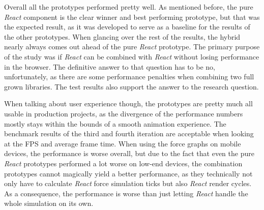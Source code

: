 Overall all the prototypes performed pretty well. As mentioned before, the pure \emph{React} component is the clear winner and best performing prototype, but that was the expected result, as it was developed to serve as a baseline for the results of the other prototypes. When glancing over the rest of the results, the hybrid nearly always comes out ahead of the pure \emph{React} prototype. The primary purpose of the study was if \emph{React} can be combined with \emph{React} without losing performance in the browser. The definitive answer to that question has to be no, unfortunately, as there are some performance penalties when combining two full grown libraries. The test results also support the answer to the research question.

When talking about user experience though, the prototypes are pretty much all usable in production projects, as the divergence of the performance numbers mostly stays within the bounds of a smooth animation experience. The benchmark results of the third and fourth iteration are acceptable when looking at the FPS and average frame time. When using the force graphs on mobile devices, the performance is worse overall, but due to the fact that even the pure \emph{React} prototypes performed a lot worse on low-end devices, the combination prototypes cannot magically yield a better performance, as they technically not only have to calculate \emph{React} force simulation ticks but also \emph{React} render cycles. As a consequence, the performance is worse than just letting \emph{React} handle the whole simulation on its own. 

